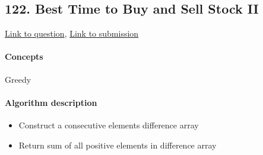 \documentclass[11pt]{book}
\begin{document}
\subsection{122. Best Time to Buy and Sell Stock II}
\href{https://leetcode.com/problems/best-time-to-buy-and-sell-stock-ii/}{Link to question},
\href{https://leetcode.com/submissions/detail/332894775/}{Link to submission}
\paragraph{Concepts} Greedy

\paragraph{Algorithm description}
\begin{itemize}
    \item Construct a consecutive elements difference array
    \item Return sum of all positive elements in difference array
\end{itemize}



 
\end{document}
